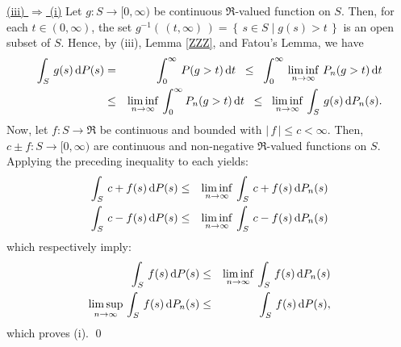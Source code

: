 \vskip 0.8cm
\noindent
\underline{(iii) $\Longrightarrow$ (i)}
\vskip 0.2cm
\noindent
Let $g : S \longrightarrow [0,\infty)$ be continuous $\Re$-valued function on $S$.
Then, for each $t \in (0,\infty)$, the set
$g^{-1}\!\left(\,(t,\infty)\,\right) = \left\{\,s \in S \;\vert\; g(s) > t \,\right\}$
is an open subset of $S$. 
Hence, by (iii), Lemma \ref{ZZZ}, and Fatou's Lemma, we have
\begin{eqnarray*}
\int_{S}\,g(s)\,\textnormal{d} P(s)
&=& \int_{0}^{\infty}\,P(g > t)\,\textnormal{d} t
\;\;\leq\;\; \int_{0}^{\infty}\,\liminf_{n\rightarrow\infty}\,P_{n}(g > t)\,\textnormal{d} t
\\
&\leq& \liminf_{n\rightarrow\infty}\,\int_{0}^{\infty} P_{n}(g > t)\,\textnormal{d} t
\;\;\leq\;\; \liminf_{n\rightarrow\infty}\,\int_{S}\,g(s)\,\textnormal{d} P_{n}(s).
\end{eqnarray*}
Now, let $f : S \longrightarrow \Re$ be continuous and bounded with $|\,f\,| \leq c < \infty$.
Then, $c \pm f : S \longrightarrow [0,\infty)$ are continuous and non-negative $\Re$-valued functions on $S$.
Applying the preceding inequality to each yields:
\begin{eqnarray*}
\int_{S}\,c + f(s)\,\textnormal{d} P(s) &\leq& \liminf_{n\rightarrow\infty}\,\int_{S}\,c + f(s)\,\textnormal{d} P_{n}(s)
\\
\int_{S}\,c - f(s)\,\textnormal{d} P(s) &\leq& \liminf_{n\rightarrow\infty}\,\int_{S}\,c - f(s)\,\textnormal{d} P_{n}(s)
\end{eqnarray*}
which respectively imply:
\begin{eqnarray*}
\int_{S}\,f(s)\,\textnormal{d} P(s) &\leq& \liminf_{n\rightarrow\infty}\,\int_{S}\,f(s)\,\textnormal{d} P_{n}(s)
\\
\limsup_{n\rightarrow\infty}\,\int_{S}\,f(s)\,\textnormal{d} P_{n}(s) &\leq& \int_{S}\,f(s)\,\textnormal{d} P(s),
\end{eqnarray*}
which proves (i).
\qed

